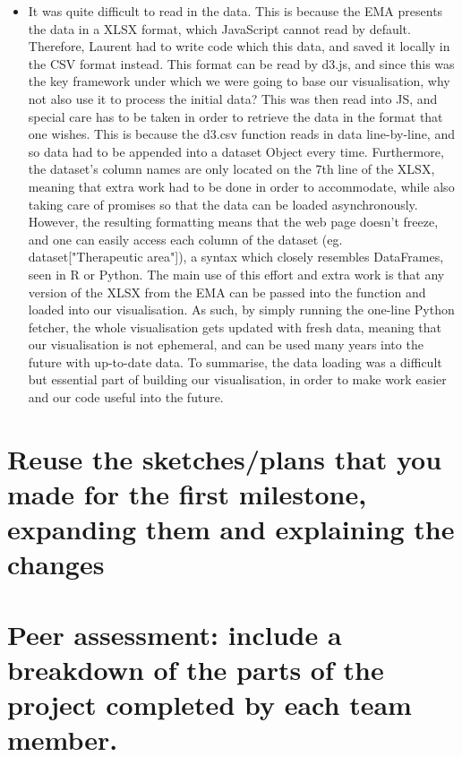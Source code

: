 \documentclass{article}
\begin{document}
\begin{itemize}
    \item It was quite difficult to read in the data. This is because the EMA presents the data in a XLSX format, which JavaScript cannot read by default. Therefore, Laurent had to write code which this data, and saved it locally in the CSV format instead. This format can be read by d3.js, and since this was the key framework under which we were going to base our visualisation, why not also use it to process the initial data? This was then read into JS, and special care has to be taken in order to retrieve the data in the format that one wishes. This is because the d3.csv function reads in data line-by-line, and so data had to be appended into a dataset Object every time. Furthermore, the dataset's column names are only located on the 7th line of the XLSX, meaning that extra work had to be done in order to accommodate, while also taking care of promises so that the data can be loaded asynchronously. However, the resulting formatting means that the web page doesn't freeze, and one can easily access each column of the dataset (eg. dataset["Therapeutic area"]), a syntax which closely resembles DataFrames, seen in R or Python. The main use of this effort and extra work is that any version of the XLSX from the EMA can be passed into the function and loaded into our visualisation. As such, by simply running the one-line Python fetcher, the whole visualisation gets updated with fresh data, meaning that our visualisation is not ephemeral, and can be used many years into the future with up-to-date data. To summarise, the data loading was a difficult but essential part of building our visualisation, in order to make work easier and our code useful into the future.
\end{itemize}

\section{Reuse the sketches/plans that you made for the first milestone, expanding them and explaining the changes}

\section{Peer assessment: include a breakdown of the parts of the project completed by each team member.}
\end{document}
